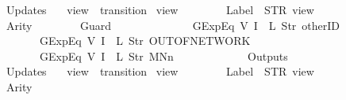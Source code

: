 \begin{isabellebody}
\ \ \ \ \ \ Updates\ {\isacharequal}\ {\isacharbrackleft}{\isacharbrackright}\isanewline
{\isasymrparr}{\isachardoublequoteclose}\isanewline
\isanewline
{}\isamarkupfalse%
\ {\isachardoublequoteopen}view{}{\isachardoublequoteclose}\ {\isacharcolon}{\isacharcolon}\ {\isachardoublequoteopen}transition{\isachardoublequoteclose}\ \isanewline
{\isachardoublequoteopen}view{}\ {\isasymequiv}\ {\isasymlparr}\isanewline
\ \ \ \ \ \ Label\ {\isacharequal}\ STR\ {\isacharprime}{\isacharprime}view{\isacharprime}{\isacharprime}{\isacharcomma}\isanewline
\ \ \ \ \ \ Arity\ {\isacharequal}\ {}{\isacharcomma}\isanewline
\ \ \ \ \ \ Guard\ {\isacharequal}\ {\isacharbrackleft}\isanewline
\ \ \ \ \ \ \ \ \ \ \ \ GExp{\isachardot}Eq\ {\isacharparenleft}V\ {\isacharparenleft}I\ {}{\isacharparenright}{\isacharparenright}\ {\isacharparenleft}L\ {\isacharparenleft}Str\ {\isacharprime}{\isacharprime}otherID{\isacharprime}{\isacharprime}{\isacharparenright}{\isacharparenright}{\isacharcomma}\isanewline
\ \ \ \ \ \ \ \ \ \ \ \ GExp{\isachardot}Eq\ {\isacharparenleft}V\ {\isacharparenleft}I\ {}{\isacharparenright}{\isacharparenright}\ {\isacharparenleft}L\ {\isacharparenleft}Str\ {\isacharprime}{\isacharprime}OUT{\isacharunderscore}OF{\isacharunderscore}NETWORK{\isacharprime}{\isacharprime}{\isacharparenright}{\isacharparenright}{\isacharcomma}\isanewline
\ \ \ \ \ \ \ \ \ \ \ \ GExp{\isachardot}Eq\ {\isacharparenleft}V\ {\isacharparenleft}I\ {}{\isacharparenright}{\isacharparenright}\ {\isacharparenleft}L\ {\isacharparenleft}Str\ {\isacharprime}{\isacharprime}MNn{}{\isacharprime}{\isacharprime}{\isacharparenright}{\isacharparenright}\isanewline
\ \ \ \ \ \ {\isacharbrackright}{\isacharcomma}\isanewline
\ \ \ \ \ \ Outputs\ {\isacharequal}\ {\isacharbrackleft}{\isacharbrackright}{\isacharcomma}\isanewline
\ \ \ \ \ \ Updates\ {\isacharequal}\ {\isacharbrackleft}{\isacharbrackright}\isanewline
{\isasymrparr}{\isachardoublequoteclose}\isanewline
\isanewline
{}\isamarkupfalse%
\ {\isachardoublequoteopen}view{}{\isachardoublequoteclose}\ {\isacharcolon}{\isacharcolon}\ {\isachardoublequoteopen}transition{\isachardoublequoteclose}\ \isanewline
{\isachardoublequoteopen}view{}\ {\isasymequiv}\ {\isasymlparr}\isanewline
\ \ \ \ \ \ Label\ {\isacharequal}\ STR\ {\isacharprime}{\isacharprime}view{\isacharprime}{\isacharprime}{\isacharcomma}\isanewline
\ \ \ \ \ \ Arity\ {\isacharequal}\ {}{\isacharcomma}\isanewline

\end{isabellebody}
